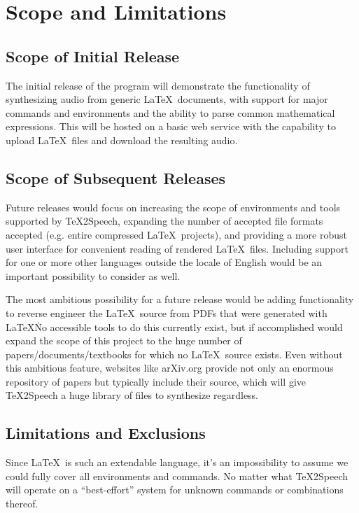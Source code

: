\section{Scope and Limitations}
%
\subsection{Scope of Initial Release}
The initial release of the program will demonstrate the functionality of synthesizing audio from generic \LaTeX\ documents, with support for major commands and environments and the ability to parse common mathematical expressions. This will be hosted on a basic web service with the capability to upload \LaTeX\ files and download the resulting audio.

\subsection{Scope of Subsequent Releases}
\par
Future releases would focus on increasing the scope of environments and tools supported by \TeX 2Speech, expanding the number of accepted file formats accepted (e.g. entire compressed \LaTeX\ projects), and providing a more robust user interface for convenient reading of rendered \LaTeX\ files. Including support for one or more other languages outside the locale of English would be an important possibility to consider as well.\\
\par
\noindent The most ambitious possibility for a future release would be adding functionality to reverse engineer the \LaTeX\ source from PDFs that were generated with \LaTeX\. No accessible tools to do this currently exist, but if accomplished would expand the scope of this project to the huge number of papers/documents/textbooks for which no \LaTeX\ source exists. Even without this ambitious feature, websites like arXiv.org provide not only an enormous repository of papers but typically include their source, which will give \TeX 2Speech a huge library of files to synthesize regardless.

\subsection{Limitations and Exclusions}
Since \LaTeX\ is such an extendable language, it’s an impossibility to assume we could fully cover all environments and commands. No matter what \TeX 2Speech will operate on a “best-effort” system for unknown commands or combinations thereof.
